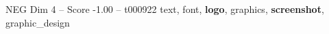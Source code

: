 \begin{textsample}{NEG Dim 4 – Score -1.00 – t000922}  \label{ex:f4_neg_008}
text, font, \textbf{logo}, graphics, \textbf{screenshot}, graphic\_design

\end{textsample}
